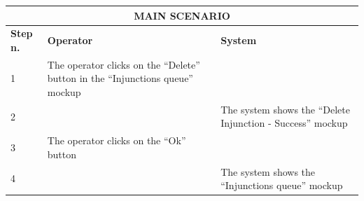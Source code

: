 {{{\begin{center}
			\begin{tabular}{|p{2cm}|p{6cm}|p{6cm}|}
			\hline
				\multicolumn{3}{|c|}{MAIN SCENARIO}\\
			\hline
				\centering \vspace{1mm} \bfseries{Step n.} \vspace{1mm} & \vspace{1mm} \bfseries{Operator} \vspace{1mm} & \vspace{1mm} \bfseries{System} \vspace{1mm}\\
			\hline
				\vspace{1mm} 1 \vspace{1mm} &
				\vspace{1mm} The operator clicks on the “Delete” button  in the “Injunctions queue” mockup\vspace{1mm} & 
				\vspace{1mm} \vspace{1mm} \\
			\hline
				\vspace{1mm} 2 \vspace{1mm} &
				\vspace{1mm} \vspace{1mm} & 
				\vspace{1mm} The system shows the “Delete Injunction - Success” mockup\vspace{1mm} \\
			\hline
				\vspace{1mm} 3 \vspace{1mm} &
				\vspace{1mm} The operator clicks on the “Ok”  button\vspace{1mm} & 
				\vspace{1mm} \vspace{1mm} \\
			\hline
				\vspace{1mm} 4 \vspace{1mm} &
				\vspace{1mm} \vspace{1mm} & 
				\vspace{1mm} The system shows the “Injunctions queue”  mockup\vspace{1mm} \\
			\hline
			\end{tabular}


\end{center}}}}
